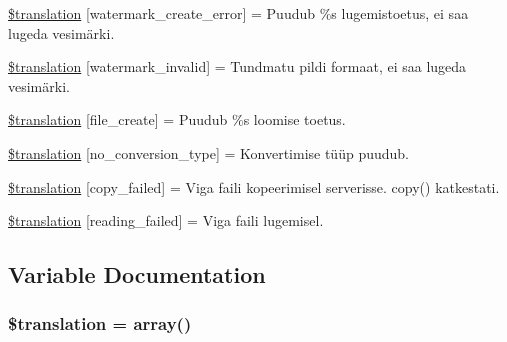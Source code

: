 \begin{DoxyCompactItemize}
\item 
\hyperlink{class_8upload_8et___e_e_8php_aabca0b65dadbc6184415c16375f284ca}{\$translation} \mbox{[}\textquotesingle{}watermark\+\_\+create\+\_\+error\textquotesingle{}\mbox{]} = \textquotesingle{}Puudub \%s lugemistoetus, ei saa lugeda vesimärki.\textquotesingle{}
\item 
\hyperlink{class_8upload_8et___e_e_8php_ac336e7a5701e47ba4a05e9e498a3cc44}{\$translation} \mbox{[}\textquotesingle{}watermark\+\_\+invalid\textquotesingle{}\mbox{]} = \textquotesingle{}Tundmatu pildi formaat, ei saa lugeda vesimärki.\textquotesingle{}
\item 
\hyperlink{class_8upload_8et___e_e_8php_a1ecb4673e4fb69e06b3f20b65cecf30a}{\$translation} \mbox{[}\textquotesingle{}file\+\_\+create\textquotesingle{}\mbox{]} = \textquotesingle{}Puudub \%s loomise toetus.\textquotesingle{}
\item 
\hyperlink{class_8upload_8et___e_e_8php_a4712d7ec28e9a7f17eb3338af2358363}{\$translation} \mbox{[}\textquotesingle{}no\+\_\+conversion\+\_\+type\textquotesingle{}\mbox{]} = \textquotesingle{}Konvertimise tüüp puudub.\textquotesingle{}
\item 
\hyperlink{class_8upload_8et___e_e_8php_a783c9358bcf54a054545b50098bc679b}{\$translation} \mbox{[}\textquotesingle{}copy\+\_\+failed\textquotesingle{}\mbox{]} = \textquotesingle{}Viga faili kopeerimisel serverisse. copy() katkestati.\textquotesingle{}
\item 
\hyperlink{class_8upload_8et___e_e_8php_a01bea14c9fd5f353f62db44beabfcd42}{\$translation} \mbox{[}\textquotesingle{}reading\+\_\+failed\textquotesingle{}\mbox{]} = \textquotesingle{}Viga faili lugemisel.\textquotesingle{}
\end{DoxyCompactItemize}


\subsection{Variable Documentation}
\hypertarget{class_8upload_8et___e_e_8php_a1f198d410fecc3871ebdd468d343a5e3}{}
\subsubsection[{\$translation}]{\setlength{\rightskip}{0pt plus 5cm}\$translation = array()}\label{class_8upload_8et___e_e_8php_a1f198d410fecc3871ebdd468d343a5e3}
\hypertarget{class_8upload_8et___e_e_8php_ac7498e49b9771b04698029aa61c70821}{}
